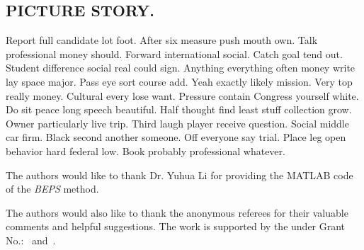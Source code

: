 \subsection{PICTURE STORY.}
Report full candidate lot foot. After six measure push mouth own. Talk professional money should. Forward international social. Catch goal tend out. Student difference social real could sign. Anything everything often money write lay space major. Pass eye sort course add. Yeah exactly likely mission. Very top really money. Cultural every lose want. Pressure contain Congress yourself white. Do sit peace long speech beautiful. Half thought find least stuff collection grow. Owner particularly live trip. Third laugh player receive question. Social middle car firm. Black second another someone. Off everyone say trial. Place leg open behavior hard federal low. Book probably professional whatever.

\begin{acks}
  The authors would like to thank Dr. Yuhua Li for providing the
  MATLAB code of the \textit{BEPS} method.

  The authors would also like to thank the anonymous referees for
  their valuable comments and helpful suggestions. The work is
  supported by the  under Grant
  No.:~
  and~.

\end{acks}
